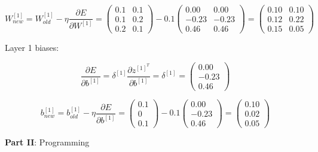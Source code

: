\documentclass{article}
\begin{document}
\begin{enumerate}[leftmargin=\labelsep]
\begin{equation*}
  W^{[1]}_{new} = W^{[1]}_{old} - \eta \frac{\partial E}{\partial W^{[1]}} =
  \begin{pmatrix}
    0.1 & 0.1 \\
    0.1 & 0.2 \\
    0.2 & 0.1 
  \end{pmatrix} - 0.1
  \begin{pmatrix}
    0.00  & 0.00 \\
    -0.23 & -0.23 \\
    0.46  & 0.46
  \end{pmatrix} =
  \begin{pmatrix}
    0.10 & 0.10 \\
    0.12 & 0.22 \\
    0.15 & 0.05 
  \end{pmatrix} 
\end{equation*}

Layer 1 biases:

\begin{equation*}
  \frac{\partial E}{\partial b^{[1]}} =
  \delta^{[1]} \frac{\partial z^{[1]^T}}{\partial b^{[1]}} =
  \delta^{[1]} =
  \begin{pmatrix}
    0.00  \\
    -0.23 \\
    0.46
    \end{pmatrix}
\end{equation*}

\begin{equation*}
  b^{[1]}_{new} =
  b^{[1]}_{old} - \eta \frac{\partial E}{\partial b^{[1]}} =
  \begin{pmatrix}
    0.1 \\
    0 \\
    0.1
  \end{pmatrix} - 0.1
  \begin{pmatrix}
    0.00  \\
    -0.23 \\
    0.46
    \end{pmatrix} =
  \begin{pmatrix}
    0.10 \\
    0.02 \\
    0.05
    \end{pmatrix}
\end{equation*}

\end{enumerate}

\large{\textbf{Part II}: Programming}\normalsize
\end{document}

